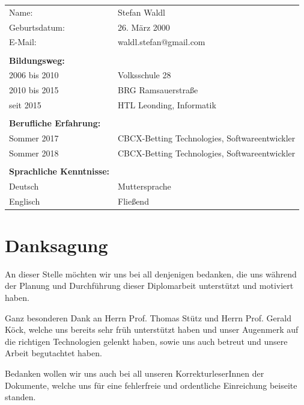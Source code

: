 \begin{table}[htb]
\begin{tabular}{ll}
Name:                            & Stefan Waldl          \\
Geburtsdatum:                    & 26. März 2000                   \\
E-Mail:                          & waldl.stefan@gmail.com          \\
                                 &                               \\
\textbf{Bildungsweg:}            &                               \\  
2006 bis 2010                    & Volksschule 28          \\
2010 bis 2015                    & BRG Ramsauerstraße    \\
seit 2015                        & HTL Leonding, Informatik      \\
                                 &                               \\
\textbf{Berufliche Erfahrung:}   &                               \\
Sommer 2017                      & CBCX-Betting Technologies, Softwareentwickler \\
Sommer 2018                      & CBCX-Betting Technologies, Softwareentwickler \\
                                 &                               \\
\textbf{Sprachliche Kenntnisse:} &                               \\
Deutsch                          & Muttersprache                 \\
Englisch                         & Fließend                     
\end{tabular}
\end{table}
\pagebreak
 

\section*{Danksagung}

An dieser Stelle möchten wir uns bei all denjenigen bedanken, die uns während der
Planung und Durchführung dieser Diplomarbeit unterstützt und motiviert haben.

Ganz besonderen Dank an Herrn Prof. Thomas Stütz und Herrn Prof. Gerald Köck, welche uns bereits sehr früh unterstützt haben und unser Augenmerk auf die richtigen Technologien gelenkt haben, sowie uns auch betreut und unsere Arbeit begutachtet haben.

Bedanken wollen wir uns auch bei all unseren KorrekturleserInnen der Dokumente, welche
uns für eine fehlerfreie und ordentliche Einreichung beiseite standen.